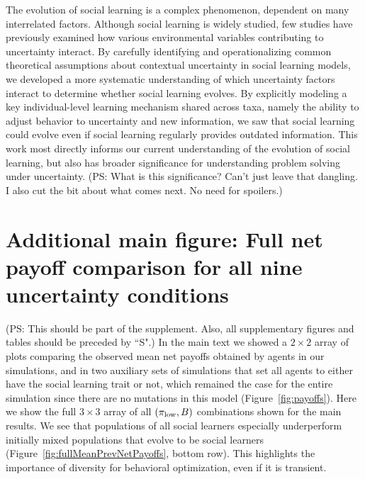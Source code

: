 \documentclass[letterpaper,11.5pt]{scrartcl}
\newcommand{\ps}[1]{{\textcolor{mygreen} {({\tiny PS:} #1)}}}
\begin{document}

The evolution of social learning is a complex phenomenon, dependent on many interrelated factors. Although social learning is widely studied, few studies have previously examined how various environmental variables contributing to uncertainty interact. 
By carefully identifying and operationalizing common theoretical assumptions about contextual uncertainty in social learning models, we developed a more systematic
understanding of which uncertainty factors interact to determine whether social
learning evolves. By explicitly modeling a key individual-level learning mechanism
shared across taxa, namely the ability to adjust behavior to uncertainty and new
information, we saw that social learning could evolve even if social learning
regularly provides outdated information. This work most directly informs our current understanding of the evolution of social learning, but also has broader significance for
understanding problem solving under uncertainty. \ps{What is this significance? Can't just leave that dangling. I also cut the bit about what comes next. No need for spoilers.} 



% 



\appendix


\section{Additional main figure: Full net payoff comparison for all nine uncertainty conditions} 
\ps{This should be part of the supplement. Also, all supplementary figures and tables should be preceded by ``S".}
In the main text we showed a $2\times2$ array of plots comparing the observed
mean net payoffs obtained by agents in our simulations, and in two auxiliary
sets of simulations that set all agents to either have the social learning
trait or not, which remained the case for the entire simulation since there
are no mutations in this model (Figure~\ref{fig:payoffs}). Here we show the full $3\times3$ array of
all $(\pi_{\mathrm{low}}, B)$ combinations shown for the main results. We see that
populations of all social learners especially underperform initially mixed
populations that evolve to be social learners 
(Figure~\ref{fig:fullMeanPrevNetPayoffs}, bottom row). This highlights the
importance of diversity for behavioral optimization, even if it is transient.
\end{document}
